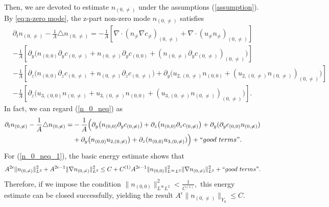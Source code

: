 \documentclass[12pt, reqno]{amsart}
\numberwithin{equation}{section}
\begin{document}
	Then, we are devoted to estimate $n_{(0,\neq)}$ under the assumptions (\ref{assumption}). 
	By \eqref{eq:n-zero mode}, the z-part non-zero mode $ n_{(0,\neq)} $ satisfies 	
	\begin{equation}\label{n_0_neq}
		\begin{aligned}
			&\partial_t n_{(0,\neq)}-\frac{1}{A}\triangle n_{(0,\neq)}
			=-\frac{1}{A}\left[\nabla\cdot(n_{\neq}\nabla c_{\neq})_{(0,\neq)}
			+\nabla\cdot(u_{\neq}n_{\neq})_{(0,\neq)}\right]\\
			&-\frac{1}{A}\left[\partial_y\big(n_{(0,0)}\partial_{y}c_{(0,\neq)}
			+n_{(0,\neq)}\partial_{y}c_{(0,0)}
			+(n_{(0,\neq)}\partial_{y}c_{(0,\neq)})_{(0,\neq)}\big)\right]\\
			&-\frac{1}{A}\left[\partial_z\big(n_{(0,0)}\partial_{z}c_{(0,\neq)}  
			+n_{(0,\neq)}\partial_{z}c_{(0,\neq)}\big)
			+\partial_y\big(u_{2,(0,\neq)}n_{(0,0)}
			+(u_{2,(0,\neq)}n_{(0,\neq)})_{(0,\neq)}\big)\right]\\
			&-\frac{1}{A}\left[\partial_z\big(u_{3,(0,0)}n_{(0,\neq)}
			+u_{3,(0,\neq)}n_{(0,0)}
			+(u_{3,(0,\neq)}n_{(0,\neq)})_{(0,\neq)}\big)\right].
		\end{aligned}
	\end{equation}
	In fact, we can regard (\ref{n_0_neq}) as 
	\begin{equation}\label{n_0_neq_1}
		\begin{aligned}
			\partial_t n_{(0,\neq)}-\frac{1}{A}\triangle n_{(0,\neq)}
			=&-\frac{1}{A}\Big(\partial_y\big(n_{(0,0)}\partial_{y}c_{(0,\neq)})+\partial_z\big(n_{(0,0)}\partial_{z}c_{(0,\neq)}\big)
			+\partial_y(\partial_{y}c_{(0,0)}n_{(0,\neq)})\\
			&+\partial_y\big(n_{(0,0)}u_{2,(0,\neq)}\big)
			+\partial_z(n_{(0,0)}u_{3,(0,\neq)})\Big)
			+``{\rm good~terms}".
		\end{aligned}
	\end{equation}
	For (\ref{n_0_neq_1}), the basic energy estimate shows that  
	$$A^{2\epsilon}\|n_{(0,\neq)}\|_{L^2}^2
	+A^{2\epsilon-1}\|\nabla n_{(0,\neq)}\|_{L^2}^2
	\leq C+C^{(1)}A^{2\epsilon-1}\|n_{(0,0)}\|_{L^{\infty}L^2}^2\|\nabla n_{(0,\neq)}\|_{L^2}^2+``{\rm good~terms}".$$
	Therefore, if we impose the condition $\|n_{(0,0)}\|_{L^{\infty}L^2}^2<\frac{1}{C^{(1)}},$ 
	this energy estimate can be closed successfully, yielding the result $A^{\epsilon}\|n_{(0,\neq)}\|_{Y_0}\leq C$. 
	
\end{document}
